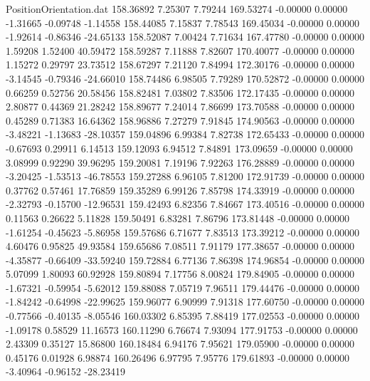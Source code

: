 \begin{filecontents}{PositionOrientation.dat}
 158.36892    7.25307    7.79244   169.53274   -0.00000    0.00000   -1.31665   -0.09748   -1.14558
 158.44085    7.15837    7.78543   169.45034   -0.00000    0.00000   -1.92614   -0.86346  -24.65133
 158.52087    7.00424    7.71634   167.47780   -0.00000    0.00000    1.59208    1.52400   40.59472
 158.59287    7.11888    7.82607   170.40077   -0.00000    0.00000    1.15272    0.29797   23.73512
 158.67297    7.21120    7.84994   172.30176   -0.00000    0.00000   -3.14545   -0.79346  -24.66010
 158.74486    6.98505    7.79289   170.52872   -0.00000    0.00000    0.66259    0.52756   20.58456
 158.82481    7.03802    7.83506   172.17435   -0.00000    0.00000    2.80877    0.44369   21.28242
 158.89677    7.24014    7.86699   173.70588   -0.00000    0.00000    0.45289    0.71383   16.64362
 158.96886    7.27279    7.91845   174.90563   -0.00000    0.00000   -3.48221   -1.13683  -28.10357
 159.04896    6.99384    7.82738   172.65433   -0.00000    0.00000   -0.67693    0.29911    6.14513
 159.12093    6.94512    7.84891   173.09659   -0.00000    0.00000    3.08999    0.92290   39.96295
 159.20081    7.19196    7.92263   176.28889   -0.00000    0.00000   -3.20425   -1.53513  -46.78553
 159.27288    6.96105    7.81200   172.91739   -0.00000    0.00000    0.37762    0.57461   17.76859
 159.35289    6.99126    7.85798   174.33919   -0.00000    0.00000   -2.32793   -0.15700  -12.96531
 159.42493    6.82356    7.84667   173.40516   -0.00000    0.00000    0.11563    0.26622    5.11828
 159.50491    6.83281    7.86796   173.81448   -0.00000    0.00000   -1.61254   -0.45623   -5.86958
 159.57686    6.71677    7.83513   173.39212   -0.00000    0.00000    4.60476    0.95825   49.93584
 159.65686    7.08511    7.91179   177.38657   -0.00000    0.00000   -4.35877   -0.66409  -33.59240
 159.72884    6.77136    7.86398   174.96854   -0.00000    0.00000    5.07099    1.80093   60.92928
 159.80894    7.17756    8.00824   179.84905   -0.00000    0.00000   -1.67321   -0.59954   -5.62012
 159.88088    7.05719    7.96511   179.44476   -0.00000    0.00000   -1.84242   -0.64998  -22.99625
 159.96077    6.90999    7.91318   177.60750   -0.00000    0.00000   -0.77566   -0.40135   -8.05546
 160.03302    6.85395    7.88419   177.02553   -0.00000    0.00000   -1.09178    0.58529   11.16573
 160.11290    6.76674    7.93094   177.91753   -0.00000    0.00000    2.43309    0.35127   15.86800
 160.18484    6.94176    7.95621   179.05900   -0.00000    0.00000    0.45176    0.01928    6.98874
 160.26496    6.97795    7.95776   179.61893   -0.00000    0.00000   -3.40964   -0.96152  -28.23419

\end{filecontents}
